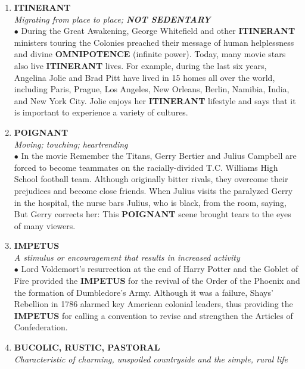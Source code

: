 \documentclass{book}
\begin{document}
\begin{enumerate}
\item \textbf{ITINERANT}\\
\textit{Migrating from place to place; \textbf{NOT SEDENTARY}}\\

$\bullet$ During the Great Awakening, George Whitefield and other \textbf{ITINERANT} ministers touring the Colonies preached their message of human helplessness and divine \textbf{OMNIPOTENCE} (infinite power). Today, many movie stars also live \textbf{ITINERANT} lives. For example, during the last six years, Angelina Jolie and Brad Pitt have lived in 15 homes all over the world, including Paris, Prague, Los Angeles, New Orleans, Berlin, Namibia, India, and New York City. Jolie enjoys her \textbf{ITINERANT} lifestyle and says that it is important to experience a variety of cultures.

\item  \textbf{POIGNANT}\\
\textit{ Moving; touching; heartrending}\\

$\bullet$ In the movie Remember the Titans, Gerry Bertier and Julius Campbell are forced to become teammates on the racially-divided T.C. Williams High School football team. Although originally bitter rivals, they overcome their prejudices and become close friends. When Julius visits the paralyzed Gerry in the hospital, the nurse bars Julius, who is black, from the room, saying,  But Gerry corrects her:  This \textbf{POIGNANT} scene brought tears to the eyes of many viewers. 

\item \textbf{IMPETUS}\\
\textit{ A stimulus or encouragement that results in increased activity }\\

$\bullet$ Lord Voldemort's resurrection at the end of Harry Potter and the Goblet of Fire provided the \textbf{IMPETUS} for the revival of the Order of the Phoenix and the formation of Dumbledore's Army. Although it was a failure, Shays' Rebellion in 1786 alarmed key American colonial leaders, thus providing the \textbf{IMPETUS} for calling a convention to revise and strengthen the Articles of Confederation. 

\item \textbf{BUCOLIC, RUSTIC, PASTORAL}\\
\textit{ Characteristic of charming, unspoiled countryside and the simple, rural life}\\


\end{enumerate}
\end{document}
